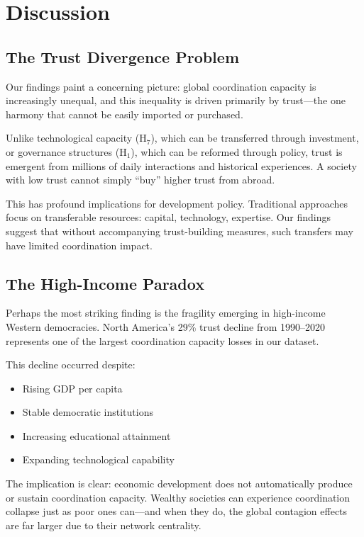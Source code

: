 \documentclass[12pt,a4paper]{article}
\begin{document}
\section{Discussion}
\label{sec:discussion}

\subsection{The Trust Divergence Problem}

Our findings paint a concerning picture: global coordination capacity is increasingly unequal, and this inequality is driven primarily by trust---the one harmony that cannot be easily imported or purchased.

Unlike technological capacity (H$_7$), which can be transferred through investment, or governance structures (H$_1$), which can be reformed through policy, trust is emergent from millions of daily interactions and historical experiences. A society with low trust cannot simply ``buy'' higher trust from abroad.

This has profound implications for development policy. Traditional approaches focus on transferable resources: capital, technology, expertise. Our findings suggest that without accompanying trust-building measures, such transfers may have limited coordination impact.

\subsection{The High-Income Paradox}

Perhaps the most striking finding is the fragility emerging in high-income Western democracies. North America's 29\% trust decline from 1990--2020 represents one of the largest coordination capacity losses in our dataset.

This decline occurred despite:
\begin{itemize}
    \item Rising GDP per capita
    \item Stable democratic institutions
    \item Increasing educational attainment
    \item Expanding technological capability
\end{itemize}

The implication is clear: economic development does not automatically produce or sustain coordination capacity. Wealthy societies can experience coordination collapse just as poor ones can---and when they do, the global contagion effects are far larger due to their network centrality.
\end{document}
